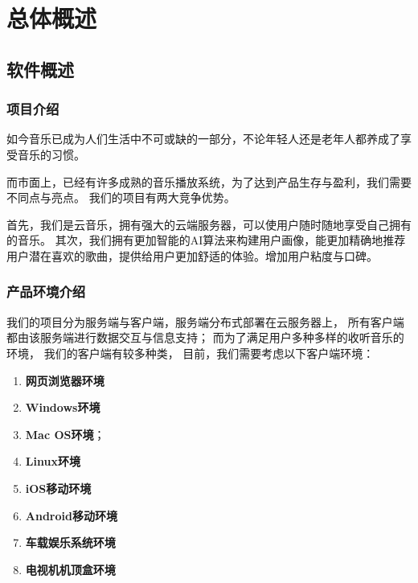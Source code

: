 
\chapter{总体概述}

\section{软件概述}
\subsection{项目介绍}

如今音乐已成为人们生活中不可或缺的一部分，不论年轻人还是老年人都养成了享受音乐的习惯。

而市面上，已经有许多成熟的音乐播放系统，为了达到产品生存与盈利，我们需要不同点与亮点。
我们的\proname 项目有两大竞争优势。

首先，我们是云音乐，拥有强大的云端服务器，可以使用户随时随地享受自己拥有的音乐。
其次，我们拥有更加智能的AI算法来构建用户画像，能更加精确地推荐用户潜在喜欢的歌曲，提供给用户更加舒适的体验。增加用户粘度与口碑。

\subsection{产品环境介绍}

我们的项目分为服务端与客户端，服务端分布式部署在云服务器上，
    所有客户端都由该服务端进行数据交互与信息支持；
    而为了满足用户多种多样的收听音乐的环境，
    我们的客户端有较多种类，
    目前，我们需要考虑以下客户端环境：
    \begin{enumerate}
        \item \textbf{网页浏览器环境}
        \item \textbf{Windows环境}
        \item \textbf{Mac OS环境}；
        \item \textbf{Linux环境}
        \item \textbf{iOS移动环境}
        \item \textbf{Android移动环境}
        \item \textbf{车载娱乐系统环境}
        \item \textbf{电视机机顶盒环境}
    \end{enumerate}

